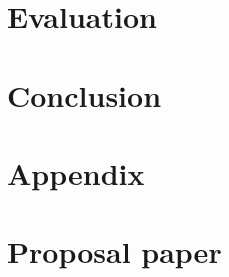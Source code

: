 \documentclass[12pt]{article}
\begin{document}
\section{Evaluation}
    \label{sec:evaluation}
    


\section{Conclusion}
    \label{sec:conclusion}
    





\newpage
\appendix
\section{Appendix}


\section{Proposal paper}

\newpage
{}
\tableofcontents
\end{document}
